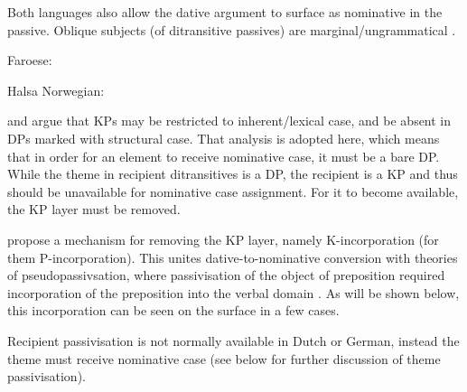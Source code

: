Both languages also allow the dative argument to surface as nominative in the passive. Oblique subjects (of ditransitive passives) are marginal/ungrammatical \citep{Eyorsson.2012}.

\begin{exe}
	\ex Faroese:
	\begin{xlist}
	\end{xlist}
	\ex Halsa Norwegian:
	\begin{xlist}
	\end{xlist}
\end{exe}

\cite{Bayer.2001} and \cite{Asbury.2007} argue that KPs may be restricted to inherent/lexical case, and be absent in DPs marked with structural case. That analysis is adopted here, which means that in order for an element to receive nominative case, it must be a bare DP. While the theme in recipient ditransitives is a DP, the recipient is a KP and thus should be unavailable for nominative case assignment. For it to become available, the KP layer must be removed.

\cite{Alexiadou.2014} propose a mechanism for removing the KP layer, namely K-incorporation (for them P-incorporation). This unites dative-to-nominative conversion with theories of pseudopassivsation, where passivisation of the object of preposition required incorporation of the preposition into the verbal domain \citep{Herslund.1984}. As will be shown below, this incorporation can be seen on the surface in a few cases.

Recipient passivisation is not normally available in Dutch or German, instead the theme must receive nominative case (see below for further discussion of theme passivisation).

